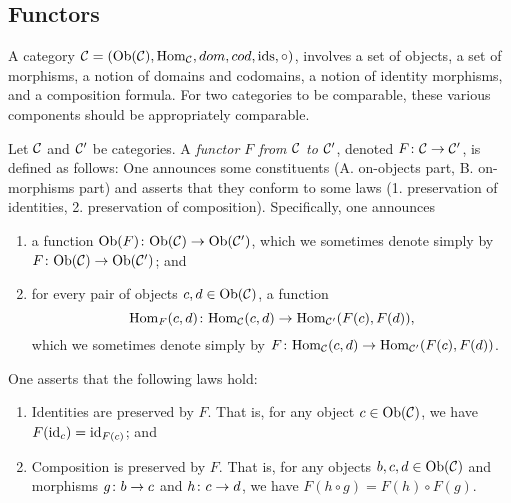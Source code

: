 
\subsection{Functors}

A category $\mathcal{C}=(\textnormal{Ob}(\mathcal{C}),\textnormal{Hom}_\mathcal{C},dom,cod,\textnormal{ids},\circ)$, involves a set of objects, a set of morphisms, a notion of domains and codomains, a notion of identity morphisms, and a composition formula. For two categories to be comparable, these various components should be appropriately comparable.

\begin{definition}\label{def:functor}

Let $\mathcal{C}$ and $\mathcal{C}'$ be categories. A {\em functor $F$ from $\mathcal{C}$ to $\mathcal{C}'$}, denoted $F\colon\mathcal{C}\rightarrow\mathcal{C}'$, is defined as follows: One announces some constituents (A. on-objects part, B. on-morphisms part) and asserts that they conform to some laws (1. preservation of identities, 2. preservation of composition). Specifically, one announces
\begin{enumerate}[\hsp A.]
\item a function $\textnormal{Ob}(F)\colon\textnormal{Ob}(\mathcal{C})\rightarrow\textnormal{Ob}(\mathcal{C}')$, which we sometimes denote simply by $F\colon\textnormal{Ob}(\mathcal{C})\rightarrow\textnormal{Ob}(\mathcal{C}')$; and
\item for every pair of objects $c,d\in\textnormal{Ob}(\mathcal{C})$, a function $$\textnormal{Hom}_F(c,d)\colon\textnormal{Hom}_\mathcal{C}(c,d)\rightarrow\textnormal{Hom}_{\mathcal{C}'}(F(c),F(d)),$$ which we sometimes denote simply by $F\colon\textnormal{Hom}_\mathcal{C}(c,d)\rightarrow\textnormal{Hom}_{\mathcal{C}'}(F(c),F(d))$.
\end{enumerate}
One asserts that the following laws hold:
\begin{enumerate}[\hsp 1.]
\item Identities are preserved by $F$. That is, for any object $c\in\textnormal{Ob}(\mathcal{C})$, we have $F(\textnormal{id}_c)=\textnormal{id}_{F(c)}$; and
\item Composition is preserved by $F$. That is, for any objects $b,c,d\in\textnormal{Ob}(\mathcal{C})$ and morphisms $g\colon b\rightarrow c$ and $h\colon c\rightarrow d$, we have $F(h\circ g)=F(h)\circ F(g)$.
\end{enumerate}
\end{definition}

